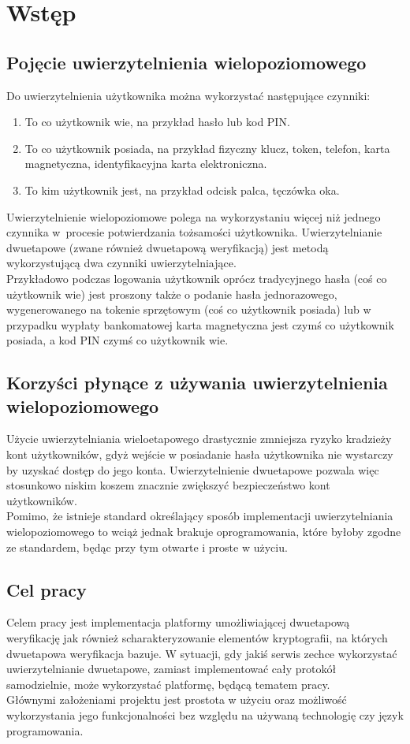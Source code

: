 \chapter{Wstęp}

\section{Pojęcie uwierzytelnienia wielopoziomowego}
Do uwierzytelnienia użytkownika można wykorzystać następujące czynniki:
\begin{enumerate}
	\item To co użytkownik wie, na przykład hasło lub kod PIN.
	\item To co użytkownik posiada, na przykład fizyczny klucz, token, telefon, karta magnetyczna, identyfikacyjna karta elektroniczna.
	\item To kim użytkownik jest, na przykład odcisk palca, tęczówka oka.
\end{enumerate}
Uwierzytelnienie wielopoziomowe polega na wykorzystaniu więcej niż jednego czynnika w~procesie potwierdzania tożsamości użytkownika.
Uwierzytelnianie dwuetapowe (zwane również dwuetapową weryfikacją) jest metodą wykorzystującą dwa czynniki uwierzytelniające. \\
Przykładowo podczas logowania użytkownik oprócz tradycyjnego hasła (coś co użytkownik wie) jest proszony także
o podanie hasła jednorazowego, wygenerowanego na tokenie sprzętowym (coś co użytkownik posiada) lub 
w przypadku wypłaty bankomatowej karta magnetyczna jest czymś co użytkownik posiada, a kod PIN czymś co użytkownik wie.

\section{Korzyści płynące z używania uwierzytelnienia wielopoziomowego}
Użycie uwierzytelniania wieloetapowego drastycznie zmniejsza ryzyko kradzieży kont użytkowników, gdyż 
wejście w posiadanie hasła użytkownika nie wystarczy by uzyskać dostęp do jego konta.
Uwierzytelnienie dwuetapowe pozwala więc stosunkowo niskim koszem znacznie zwiększyć bezpieczeństwo kont użytkowników. \\
Pomimo, że istnieje standard określający sposób implementacji uwierzytelniania wielopoziomowego to wciąż jednak brakuje oprogramowania, 
które byłoby zgodne ze standardem, będąc przy tym otwarte i proste w użyciu. 

\section{Cel pracy}
Celem pracy jest implementacja platformy umożliwiającej dwuetapową weryfikację jak również scharakteryzowanie 
elementów kryptografii, na których dwuetapowa weryfikacja bazuje. 
W sytuacji, gdy jakiś serwis zechce wykorzystać uwierzytelnianie dwuetapowe,
zamiast implementować cały protokół samodzielnie, może wykorzystać platformę, będącą tematem pracy. \\
Głównymi założeniami projektu jest prostota w użyciu oraz możliwość wykorzystania jego funkcjonalności 
bez względu na używaną technologię czy język programowania.